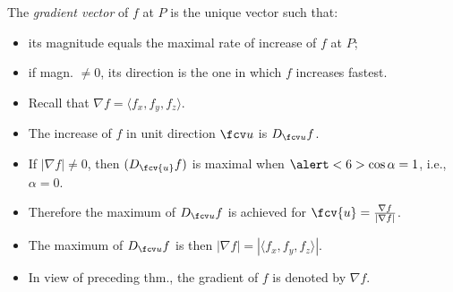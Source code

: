 \begin{frame}
\begin{definition}
The \emph{gradient vector} of $f$ at $P$ is the unique vector such that:
\begin{itemize}
\item its magnitude equals  the maximal rate of increase of $f$ at $P$;
\item if magn. $\neq 0$, its \alert<2>{direction is the one in which $f$ increases fastest}.
\end{itemize}
\end{definition}
\begin{itemize}
\item<3-> Recall that $\nabla f=\langle f_x, f_y, f_z\rangle$.
\item<2-> \alert<2>{ The increase of $f$} in \alert<5>{unit direction $\fcv u$} \alert<2>{is $D_{\fcv u} f $}.  
\item<6-> If $|\nabla f| \neq 0$, then $(D_{\fcv{u}}f)$ is maximal when $\alert<6>{\cos \alpha=1}$, i.e., $\alpha = 0$.
\item<7-> Therefore the maximum of $D_{\fcv u}f$ is achieved for $\fcv{u} =\frac{\nabla f}{|\nabla f|}$.
\item<8-> The maximum of $D_{\fcv u}f$ is then $|\nabla f| = |\langle f_x, f_y , f_z\rangle|$.
\item<10-> In view of preceding thm., the gradient of $f$ is denoted by $\nabla f$.
\end{itemize}
\end{frame}